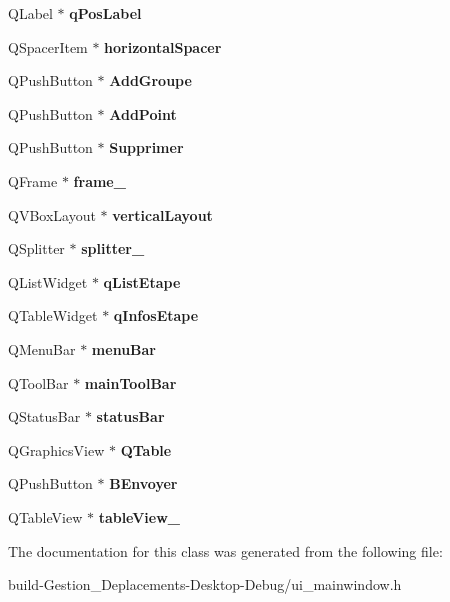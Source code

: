 \begin{DoxyCompactItemize}
\item 
Q\-Label $\ast$ {\bfseries q\-Pos\-Label}\label{class_ui___main_window_a5e8dba76e1cc0c8448e861882721000f}

\item 
Q\-Spacer\-Item $\ast$ {\bfseries horizontal\-Spacer}\label{class_ui___main_window_ae189b5a48fa6e6f4b6775f1f832afe9c}

\item 
Q\-Push\-Button $\ast$ {\bfseries Add\-Groupe}\label{class_ui___main_window_a3843edcf211085038db405ad945f3cbd}

\item 
Q\-Push\-Button $\ast$ {\bfseries Add\-Point}\label{class_ui___main_window_afcad753cc22e9a7dbc50397c713a6b14}

\item 
Q\-Push\-Button $\ast$ {\bfseries Supprimer}\label{class_ui___main_window_a8c5a711e2d5e2295b387f4181c000f8e}

\item 
Q\-Frame $\ast$ {\bfseries frame\-\_}\label{class_ui___main_window_a0f39414677a19e516a363ce9e4207424}

\item 
Q\-V\-Box\-Layout $\ast$ {\bfseries vertical\-Layout}\label{class_ui___main_window_a649287f742c9a33b8444116dccb1b72b}

\item 
Q\-Splitter $\ast$ {\bfseries splitter\-\_}\label{class_ui___main_window_a8a8b121fe909315159bc4d287c1c2488}

\item 
Q\-List\-Widget $\ast$ {\bfseries q\-List\-Etape}\label{class_ui___main_window_a595a0a6bc302e68cdac851c987153807}

\item 
Q\-Table\-Widget $\ast$ {\bfseries q\-Infos\-Etape}\label{class_ui___main_window_a5224b98a08efd2a04c917693ee64ef21}

\item 
Q\-Menu\-Bar $\ast$ {\bfseries menu\-Bar}\label{class_ui___main_window_a502a50d7dc22415f511336bdfb4318b9}

\item 
Q\-Tool\-Bar $\ast$ {\bfseries main\-Tool\-Bar}\label{class_ui___main_window_abca26371605d7c5235fab5188d4bdcf7}

\item 
Q\-Status\-Bar $\ast$ {\bfseries status\-Bar}\label{class_ui___main_window_afa919f3af6f2f526a70f1fa331f63724}

\item 
Q\-Graphics\-View $\ast$ {\bfseries Q\-Table}\label{class_ui___main_window_a4043b83f277a7f93920dd493ef154adf}

\item 
Q\-Push\-Button $\ast$ {\bfseries B\-Envoyer}\label{class_ui___main_window_a47c721626085d59a52f5e4d77bdd023c}

\item 
Q\-Table\-View $\ast$ {\bfseries table\-View\-\_}\label{class_ui___main_window_a922f8b861682d7eb2dc7b723a2c3e6cc}

\end{DoxyCompactItemize}


The documentation for this class was generated from the following file\-:\begin{DoxyCompactItemize}
\item 
build-\/\-Gestion\-\_\-\-Deplacements-\/\-Desktop-\/\-Debug/ui\-\_\-mainwindow.\-h\end{DoxyCompactItemize}
